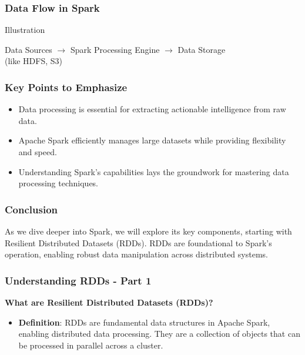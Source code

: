 \documentclass{beamer}
\begin{document}
\begin{frame}[fragile]
    \frametitle{Data Flow in Spark}
    \begin{block}{Illustration}
        \begin{center}
            Data Sources $\rightarrow$ Spark Processing Engine $\rightarrow$ Data Storage \\
            (like HDFS, S3)
        \end{center}
    \end{block}
\end{frame}

\begin{frame}[fragile]
    \frametitle{Key Points to Emphasize}
    \begin{itemize}
        \item Data processing is essential for extracting actionable intelligence from raw data.
        \item Apache Spark efficiently manages large datasets while providing flexibility and speed.
        \item Understanding Spark’s capabilities lays the groundwork for mastering data processing techniques.
    \end{itemize}
\end{frame}

\begin{frame}[fragile]
    \frametitle{Conclusion}
    As we dive deeper into Spark, we will explore its key components, starting with Resilient Distributed Datasets (RDDs). RDDs are foundational to Spark’s operation, enabling robust data manipulation across distributed systems.
\end{frame}

\begin{frame}[fragile]
    \frametitle{Understanding RDDs - Part 1}

    \textbf{What are Resilient Distributed Datasets (RDDs)?}
    \begin{itemize}
        \item \textbf{Definition}: 
        RDDs are fundamental data structures in Apache Spark, enabling distributed data processing. They are a collection of objects that can be processed in parallel across a cluster.
    \end{itemize}
\end{frame}
\end{document}
